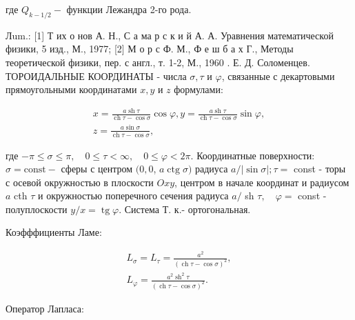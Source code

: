 \documentclass[10pt]{article}
\begin{document}
где $Q_{k-1 / 2}-$ функции Лежандра 2-го рода.



Лum.: [1] Т их о нов А. Н., С а ма р с к и й А. А. Уравнения математической физики, 5 изд., М., 1977; [2] М о р с Ф. М., Ф е ш б а х Г., Методы теоретической физики, пер. с англ., т. 1-2, М., 1960 . Е. Д. Соломенцев. ТОРОИДАЛЬНЫЕ КООРДИНАТЫ - числа $\sigma, \tau$ и $\varphi$, связанные с декартовыми прямоугольными координатами $x, y$ и $z$ формулами:



\[

\begin{gathered}

x=\frac{a \operatorname{sh} \tau}{\operatorname{ch} \tau-\cos \sigma} \cos \varphi, y=\frac{a \operatorname{sh} \tau}{\operatorname{ch} \tau-\cos \sigma} \sin \varphi, \\

z=\frac{a \sin \sigma}{\operatorname{ch} \tau-\cos \sigma},

\end{gathered}

\]



где $-\pi \leqslant \sigma \leqslant \pi, \quad 0 \leqslant \tau<\infty, \quad 0 \leqslant \varphi<2 \pi$. Координатные поверхности: $\sigma=\mathrm{const}-$ сферы с центром $(0,0$, $a \operatorname{ctg} \sigma)$ радиуса $a /|\sin \sigma| ; \tau=$ const - торы с осевой окружностью в плоскости $O x y$, центром в начале координат и радиусом $a$ cth $\tau$ и окружностью поперечного сечения радиуса $a /$ sh $\tau, \quad \varphi=$ const - полуплоскости $y / x=\operatorname{tg} \varphi$. Система Т. к.- ортогональная.



Коэфффициенты Ламе:



\[

\begin{gathered}

L_{\sigma}=L_{\tau}=\frac{a^{2}}{(\operatorname{ch} \tau-\cos \sigma)^{2}}, \\

L_{\varphi}=\frac{a^{2} \operatorname{sh}^{2} \tau}{(\operatorname{ch} \tau-\cos \sigma)^{2}} .

\end{gathered}

\]



Оператор Лапласа:
\end{document}
